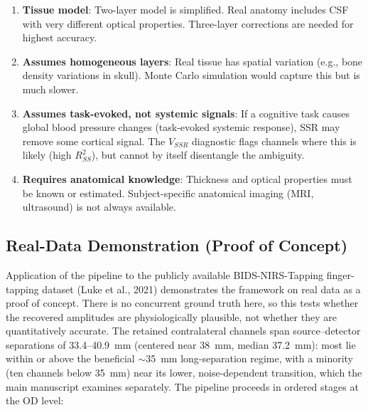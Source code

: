 \documentclass[12pt]{article}
\def\mathrm#1{#1}%
\begin{document}
\begin{enumerate}
\item \textbf{Tissue model}: Two-layer model is simplified. Real anatomy includes CSF with very different optical properties. Three-layer corrections are needed for highest accuracy.

\item \textbf{Assumes homogeneous layers}: Real tissue has spatial variation (e.g., bone density variations in skull). Monte Carlo simulation would capture this but is much slower.

\item \textbf{Assumes task-evoked, not systemic signals}: If a cognitive task causes global blood pressure changes (task-evoked systemic response), SSR may remove some cortical signal. The $V_{\mathrm{SSR}}$ diagnostic flags channels where this is likely (high $R^2_{\mathrm{SS}}$), but cannot by itself disentangle the ambiguity.

\item \textbf{Requires anatomical knowledge}: Thickness and optical properties must be known or estimated. Subject-specific anatomical imaging (MRI, ultrasound) is not always available.

\end{enumerate}

\subsection{Real-Data Demonstration (Proof of Concept)}

Application of the pipeline to the publicly available BIDS-NIRS-Tapping finger-tapping dataset (Luke et al., 2021) demonstrates the framework on real data as a proof of concept. There is no concurrent ground truth here, so this tests whether the recovered amplitudes are physiologically plausible, not whether they are quantitatively accurate. The retained contralateral channels span source--detector separations of 33.4--40.9~mm (centered near 38~mm, median 37.2~mm): most lie within or above the beneficial $\sim$35~mm long-separation regime, with a minority (ten channels below 35~mm) near its lower, noise-dependent transition, which the main manuscript examines separately. The pipeline proceeds in ordered stages at the OD level:
\end{document}

